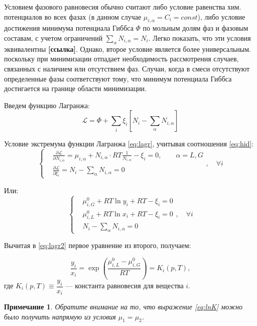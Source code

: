 \documentclass[12pt]{article}
\newcommand{\pd}[2]{\frac{\partial #1}{\partial #2}}
\newtheorem{note}{Примечание}[section]
\begin{document}
Условием фазового равновесия обычно считают либо условие равенства хим. потенциалов во всех фазах (в данном случае $\mu_{i, \alpha} = C_i = const$), либо условие достижения минимума потенциала Гиббса $\Phi$ по мольным долям фаз и фазовым составам, с учетом ограничений $\sum_\alpha N_{i, \alpha} = N_i$. Легко показать, что эти условия эквивалентны \textbf{[ссылка]}. Однако, второе условие является более универсальным. поскольку при минимизации отпадает необходимость рассмотрения случаев, связанных с наличием или отсутствием фаз. Случаи, когда в смеси отсутствуют определенные фазы соответствуют тому, что минимум потенциала Гиббса достигается на границе области минимизации.

Введем функцию Лагранжа:
\begin{equation}
\mathscr{L} = \Phi + \sum_i\xi_i \left[N_i - \sum_\alpha N_{i, \alpha} \right]
\label{eq:lagr}
\end{equation} 


Условие экстремума функции Лагранжа \eqref{eq:lagr}, учитывая соотношения \eqref{eq:hid}:
\[
\left\{
\begin{aligned}
& \pd{\mathscr{L}}{N_{i, \alpha}} = \mu_{i, \alpha} + N_{i, \alpha} \cdot RT \frac{1}{N_{i, \alpha}} - \xi_i = 0, \qquad \alpha=L, G \\
& \pd{\mathscr{L}}{\xi_i} = N_i - \sum_{\alpha} N_{i,\alpha} = 0 
\end{aligned}
\right.,\quad\forall i
\]

Или:
\begin{equation}
\left\{
\begin{aligned}
& \mu_{i, G}^0 + RT \ln y_i + RT - \xi_i = 0\\
& \mu_{i, L}^0 + RT \ln x_i + RT - \xi_i = 0\\
& N_i - \sum_{\alpha} N_{i,\alpha} = 0
\end{aligned}
\label{eq:lagr2}
\right.,\quad\forall i
\end{equation}

Вычитая в \eqref{eq:lagr2} первое уравнение из второго, получаем:

\begin{equation}
\frac{y_i}{x_i} = \exp \left(\frac{\mu_{i, L}^0 - \mu_{i, G}^0}{RT}\right) = K_i(p,T),
\label{eq:lnK}
\end{equation}
где $K_i(p,T) \equiv \dfrac{y_i}{x_i}$ --- константа равновесия для вещества $i$.


\begin{note}
Обратите внимание на то, что выражение \eqref{eq:lnK} можно было получить напрямую из условия $\mu_1 = \mu_2$.
\end{note}
\end{document}
